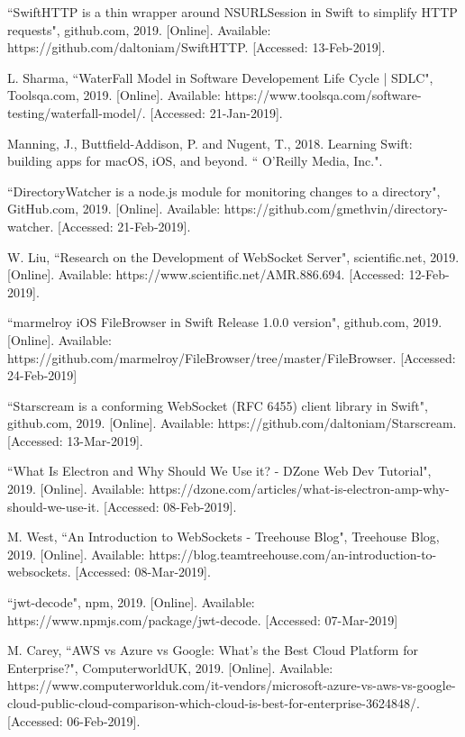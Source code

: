 \documentclass{article}
\begin{document}
\begin{thebibliography}{99}

 ``SwiftHTTP is a thin wrapper around NSURLSession in Swift to simplify HTTP requests", github.com, 2019. [Online]. Available: https://github.com/daltoniam/SwiftHTTP. [Accessed: 13-Feb-2019].

 L. Sharma, ``WaterFall Model in Software Developement Life Cycle | SDLC", Toolsqa.com, 2019. [Online]. Available: https://www.toolsqa.com/software-testing/waterfall-model/. [Accessed: 21-Jan-2019].

 Manning, J., Buttfield-Addison, P. and Nugent, T., 2018. Learning Swift: building apps for macOS, iOS, and beyond. `` O'Reilly Media, Inc.".

 ``DirectoryWatcher is a node.js module for monitoring changes to a directory", GitHub.com, 2019. [Online]. Available: https://github.com/gmethvin/directory-watcher. [Accessed: 21-Feb-2019].

 W. Liu, ``Research on the Development of WebSocket Server", scientific.net, 2019. [Online]. Available: https://www.scientific.net/AMR.886.694. [Accessed: 12-Feb-2019].

 ``marmelroy iOS FileBrowser in Swift Release 1.0.0 version", github.com, 2019. [Online]. Available: https://github.com/marmelroy/FileBrowser/tree/master/FileBrowser. [Accessed: 24-Feb-2019]

 ``Starscream is a conforming WebSocket (RFC 6455) client library in Swift", github.com, 2019. [Online]. Available: https://github.com/daltoniam/Starscream. [Accessed: 13-Mar-2019].

 ``What Is Electron and Why Should We Use it? - DZone Web Dev Tutorial", 2019. [Online]. Available: https://dzone.com/articles/what-is-electron-amp-why-should-we-use-it. [Accessed: 08-Feb-2019].

 M. West, ``An Introduction to WebSockets - Treehouse Blog", Treehouse Blog, 2019. [Online]. Available: https://blog.teamtreehouse.com/an-introduction-to-websockets. [Accessed: 08-Mar-2019].

 ``jwt-decode", npm, 2019. [Online]. Available: https://www.npmjs.com/package/jwt-decode. [Accessed: 07-Mar-2019] 

 M. Carey, ``AWS vs Azure vs Google: What's the Best Cloud Platform for Enterprise?", ComputerworldUK, 2019. [Online]. Available: https://www.computerworlduk.com/it-vendors/microsoft-azure-vs-aws-vs-google-cloud-public-cloud-comparison-which-cloud-is-best-for-enterprise-3624848/. [Accessed: 06-Feb-2019].


\end{thebibliography}
\end{document}
